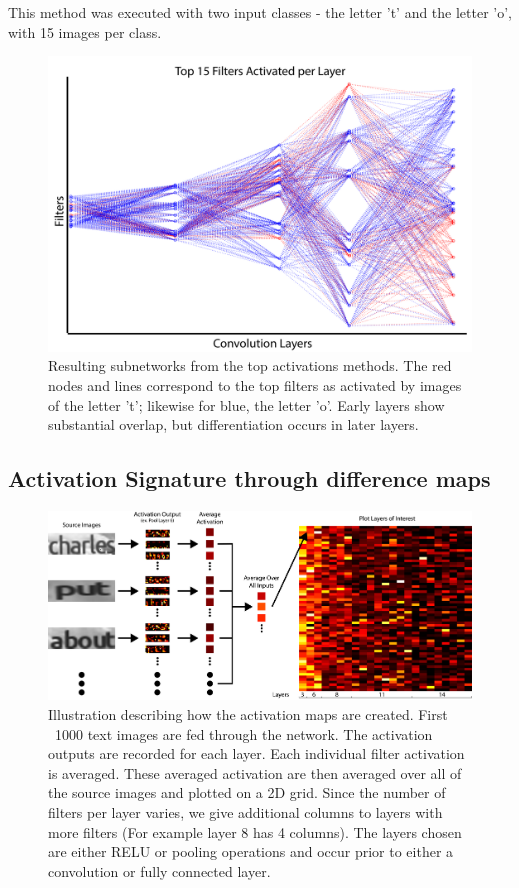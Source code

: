 \documentclass[10pt,twocolumn,letterpaper]{article}
\begin{document}
This method was executed with two input classes - the letter 't' and the letter 'o', with 15 images per class. 


\begin{figure}
\includegraphics[width=\columnwidth]{Figures/max_activations/max_activations-01.png}
\caption{Resulting subnetworks from the top activations methods. The red nodes and lines correspond to the top filters as activated by images of the letter 't'; likewise for blue, the letter 'o'. Early layers show substantial overlap, but differentiation occurs in later layers.}
\label{fig:activationgraph}
\end{figure}


\subsection{Activation Signature through difference maps} \label{sec:subnetwork}
\begin{figure}
\centering
\includegraphics[width=1\textwidth]{Figures/activations_map_overview/act_map_overview-01.png}
\caption{Illustration describing how the activation maps are created. First ~1000 text images are fed through the network. The activation outputs are recorded for each layer. Each individual filter activation is averaged. These averaged activation are then averaged over all of the source images and plotted on a 2D grid. Since the number of filters per layer varies, we give additional columns to layers with more filters (For example layer 8 has 4 columns). The layers chosen are either RELU or pooling operations and occur prior to either a convolution or fully connected layer.}
\label{fig:subvis}
\end{figure}
\end{document}

